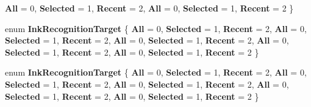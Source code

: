 \begin{DoxyCompactItemize}
{\bfseries All} = 0, 
{\bfseries Selected} = 1, 
{\bfseries Recent} = 2, 
\newline
{\bfseries All} = 0, 
{\bfseries Selected} = 1, 
{\bfseries Recent} = 2
 \}
\item 
\mbox{\label{namespace_windows_1_1_u_i_1_1_input_1_1_inking_abaa7a28e27eb8ea61a8cf8c5b63fb20d}} 
enum {\bfseries Ink\+Recognition\+Target} \{ \newline
{\bfseries All} = 0, 
{\bfseries Selected} = 1, 
{\bfseries Recent} = 2, 
{\bfseries All} = 0, 
\newline
{\bfseries Selected} = 1, 
{\bfseries Recent} = 2, 
{\bfseries All} = 0, 
{\bfseries Selected} = 1, 
\newline
{\bfseries Recent} = 2, 
{\bfseries All} = 0, 
{\bfseries Selected} = 1, 
{\bfseries Recent} = 2, 
\newline
{\bfseries All} = 0, 
{\bfseries Selected} = 1, 
{\bfseries Recent} = 2
 \}
\item 
\mbox{\label{namespace_windows_1_1_u_i_1_1_input_1_1_inking_abaa7a28e27eb8ea61a8cf8c5b63fb20d}} 
enum {\bfseries Ink\+Recognition\+Target} \{ \newline
{\bfseries All} = 0, 
{\bfseries Selected} = 1, 
{\bfseries Recent} = 2, 
{\bfseries All} = 0, 
\newline
{\bfseries Selected} = 1, 
{\bfseries Recent} = 2, 
{\bfseries All} = 0, 
{\bfseries Selected} = 1, 
\newline
{\bfseries Recent} = 2, 
{\bfseries All} = 0, 
{\bfseries Selected} = 1, 
{\bfseries Recent} = 2, 
\newline
{\bfseries All} = 0, 
{\bfseries Selected} = 1, 
{\bfseries Recent} = 2
 \}
\end{DoxyCompactItemize}
